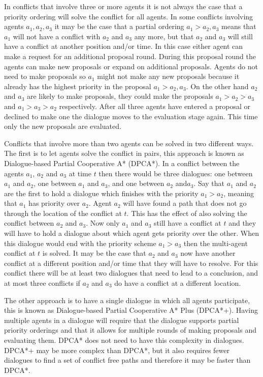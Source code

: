 In conflicts that involve three or more agents it is not always the case that a
priority ordering will solve the conflict for all agents. In some conflicts
involving agents $a_1, a_2, a_3$ it may be the case that a partial ordering
$a_1 > a_2, a_3$ means that $a_1$ will not have a conflict with $a_2$ and $a_3$
any more, but that $a_2$ and $a_3$ will still have a conflict at another
position and/or time. In this case either agent can make a request for an
additional proposal round. During this proposal round the agents can make new
proposals or expand on additional proposals. Agents do not need to make
proposals so $a_1$ might not make any new proposals because it already has the
highest priority in the proposal $a_1 > a_2, a_3$. On the other hand $a_2$ and
$a_3$ are likely to make proposals, they could make the proposals $a_1 > a_2 >
a_3$ and $a_1 > a_3 > a_2$ respectively. After all three agents have entered a
proposal or declined to make one the dialogue moves to the evaluation stage
again. This time only the new proposals are evaluated.

Conflicts that involve more than two agents can be solved in two different
ways. The first is to let agents solve the conflict in pairs, this approach is
known as Dialogue-based Partial Cooperative A* (DPCA*). In a conflict between
the agents $a_1$, $a_2$ and $a_3$ at time $t$ then there would be three
dialogues: one between $a_1$ and $a_2$, one between $a_1$ and $a_3$, and one
between $a_2$ and$a_3$. Say that $a_1$ and $a_2$ are the first to hold a
dialogue which finishes with the priority $a_1 > a_2$, meaning that $a_1$ has
priority over $a_2$. Agent $a_2$ will have found a path that does not go
through the location of the conflict at $t$. This has the effect of also
solving the conflict between $a_2$ and $a_3$. Now only $a_1$ and $a_3$ still
have a conflict at $t$ and they will have to hold a dialogue about which agent
gets priority over the other. When this dialogue would end with the priority
scheme $a_1 > a_3$ then the multi-agent conflict at $t$ is solved. It may be
the case that $a_2$ and $a_3$ now have another conflict at a different position
and/or time that they will have to resolve. For this conflict there will be at
least two dialogues that need to lead to a conclusion, and at most three
conflicts if $a_2$ and $a_3$ do have a conflict at a different location.

The other approach is to have a single dialogue in which all agents
participate, this is known as Dialogue-based Partial Cooperative A* Plus
(DPCA*+). Having multiple agents in a dialogue will require that the dialogue
supports partial priority orderings and that it allows for multiple rounds of
making proposals and evaluating them. DPCA* does not need to have this
complexity in dialogues. DPCA*+ may be more complex than DPCA*, but it also
requires fewer dialogues to find a set of conflict free paths and therefore it
may be faster than DPCA*.

